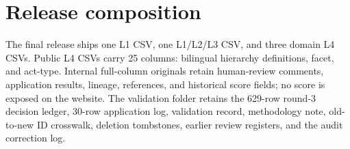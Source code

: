 \documentclass[11pt,a4paper]{article}
\begin{document}
\par\section{Release composition}
The final release ships one L1 CSV, one L1/L2/L3 CSV, and three domain L4 CSVs. Public L4 CSVs carry 25 columns: bilingual hierarchy definitions, facet, and act-type. Internal full-column originals retain human-review comments, application results, lineage, references, and historical score fields; no score is exposed on the website. The validation folder retains the 629-row round-3 decision ledger, 30-row application log, validation record, methodology note, old-to-new ID crosswalk, deletion tombstones, earlier review registers, and the audit correction log.
\end{document}
